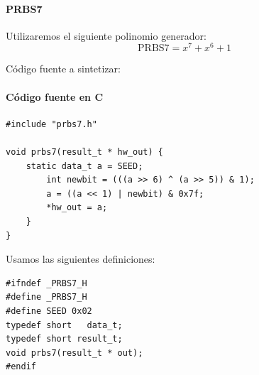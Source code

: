 \paragraph{PRBS7}
Utilizaremos el siguiente polinomio generador:
\begin{equation*}
\mbox{PRBS7} = x^7 + x^6 + 1
\end{equation*}

Código fuente a sintetizar:

\paragraph{Código fuente en C}
\begin{lstlisting}
#include "prbs7.h"

void prbs7(result_t * hw_out) {
    static data_t a = SEED;
        int newbit = (((a >> 6) ^ (a >> 5)) & 1);
        a = ((a << 1) | newbit) & 0x7f;
        *hw_out = a;
    }
}
\end{lstlisting}


Usamos las siguientes definiciones:
\begin{lstlisting}
#ifndef _PRBS7_H
#define _PRBS7_H
#define SEED 0x02
typedef short   data_t;
typedef short result_t;
void prbs7(result_t * out);
#endif
\end{lstlisting}


